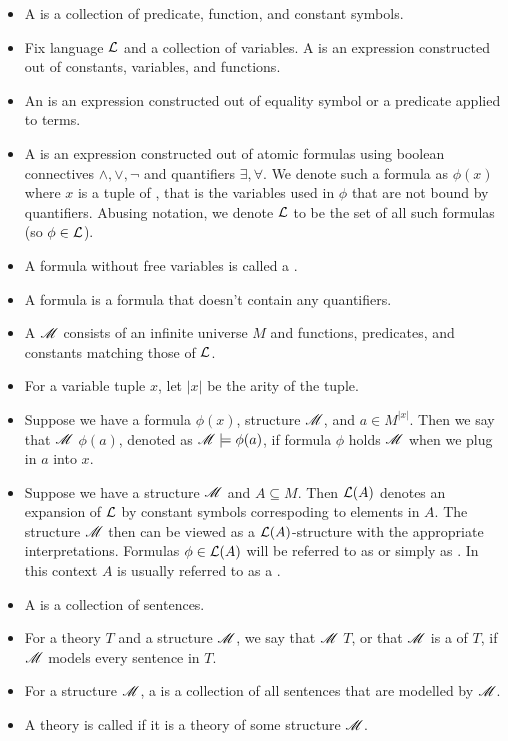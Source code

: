 \begin{Definition} \;
  \begin{itemize}
  \item A  is a collection of predicate, function, and constant symbols.
  \item Fix language $\mathcal L$ and a collection of variables.
    A  is an expression constructed out of constants, variables, and functions.
  \item An  is an expression constructed out of equality symbol or a predicate applied to terms.
  \item A  is an expression constructed out of atomic formulas using boolean connectives
    $\wedge, \vee, \neg$ and quantifiers $\exists, \forall$.
    We denote such a formula as $\phi(x)$ where $x$ is a tuple of ,
    that is the variables used in $\phi$ that are not bound by quantifiers.
    Abusing notation, we denote $\mathcal L$ to be the set of all such formulas (so $\phi \in \mathcal L$).
  \item A formula without free variables is called a .
  \item A  formula is a formula that doesn't contain any quantifiers.
  \item A  $\mathscr M$ consists of an infinite universe $M$ and functions, predicates, and constants matching those of $\mathcal L$.
  \item For a variable tuple $x$, let $|x|$ be the arity of the tuple.
  \item Suppose we have a formula $\phi(x)$, structure $\mathscr M$, and $a \in M^{|x|}$.
    Then we say that $\mathscr M$  $\phi(a)$, denoted as $\mathscr M \models \phi(a)$,
    if formula $\phi$ holds $\mathscr M$ when we plug in $a$ into $x$.
  \item Suppose we have a structure $\mathscr M$ and $A \subseteq M$.
    Then $\mathcal L(A)$ denotes an expansion of $\mathcal L$ by constant symbols correspoding to elements in $A$.
    The structure $\mathscr M$ then can be viewed as a $\mathcal L(A)$-structure with the appropriate interpretations.
    Formulas $\phi \in \mathcal L(A)$ will be referred to as  or simply as .
    In this context $A$ is usually referred to as a .
  \item A  is a collection of sentences.
  \item For a theory $T$ and a structure $\mathscr M$, we say that $\mathscr M$  $T$,
    or that $\mathscr M$ is a  of $T$, if $\mathscr M$ models every sentence in $T$.
  \item For a structure $\mathscr M$, a  is a collection of all sentences that are modelled by $\mathscr M$.
  \item A theory is called  if it is a theory of some structure $\mathscr M$.
  \end{itemize}  
\end{Definition}

